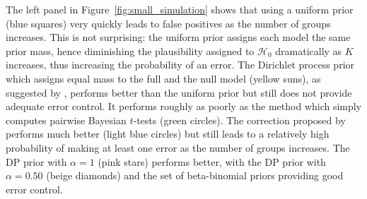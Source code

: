 \documentclass[11pt,a4paper]{article}
\theoremstyle{definition} %
\theoremstyle{case}
\begin{document}

The left panel in Figure~\ref{fig:small_simulation} shows that using a uniform prior (blue squares) very quickly leads to false positives as the number of groups increases. This is not surprising: the uniform prior assigns each model the same prior mass, hence diminishing the plausibility assigned to $\mathcal{H}_0$ dramatically as $K$ increases, thus increasing the probability of an error. The Dirichlet process prior which assigns equal mass to the full and the null model (yellow suns), as suggested by \textcite{gopalan1998bayesian}, performs better than the uniform prior but still does not provide adequate error control. It performs roughly as poorly as the method which simply computes pairwise Bayesian $t$-tests (green circles). The correction proposed by \textcite{westfall1997bayesian} performs much better (light blue circles) but still leads to a relatively high probability of making at least one error as the number of groups increases. The DP prior with $\alpha = 1$ (pink stars) performs better, with the DP prior with $\alpha = 0.50$ (beige diamonds) and the set of beta-binomial priors providing good error control.
\end{document}
